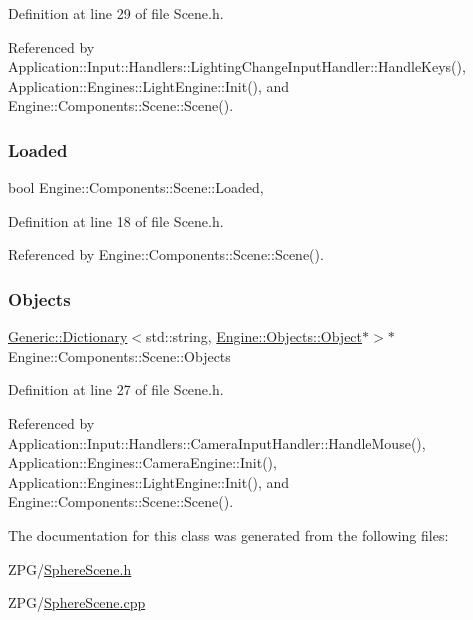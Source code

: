 Definition at line 29 of file Scene.\+h.



Referenced by Application\+::\+Input\+::\+Handlers\+::\+Lighting\+Change\+Input\+Handler\+::\+Handle\+Keys(), Application\+::\+Engines\+::\+Light\+Engine\+::\+Init(), and Engine\+::\+Components\+::\+Scene\+::\+Scene().

\mbox{\label{classEngine_1_1Components_1_1Scene_ae828757eea5410550f6674421051a783}} 
\subsubsection{\texorpdfstring{Loaded}{Loaded}}
{\footnotesize\ttfamily bool Engine\+::\+Components\+::\+Scene\+::\+Loaded\hspace{0.3cm}{\ttfamily [protected]}, {\ttfamily [inherited]}}



Definition at line 18 of file Scene.\+h.



Referenced by Engine\+::\+Components\+::\+Scene\+::\+Scene().

\mbox{\label{classEngine_1_1Components_1_1Scene_a23481feabaaa56bf5613765db03af4da}} 
\subsubsection{\texorpdfstring{Objects}{Objects}}
{\footnotesize\ttfamily \mbox{\hyperlink{classGeneric_1_1Dictionary}{Generic\+::\+Dictionary}}$<$std\+::string, \mbox{\hyperlink{classEngine_1_1Objects_1_1Object}{Engine\+::\+Objects\+::\+Object}}$\ast$$>$$\ast$ Engine\+::\+Components\+::\+Scene\+::\+Objects\hspace{0.3cm}{\ttfamily [inherited]}}



Definition at line 27 of file Scene.\+h.



Referenced by Application\+::\+Input\+::\+Handlers\+::\+Camera\+Input\+Handler\+::\+Handle\+Mouse(), Application\+::\+Engines\+::\+Camera\+Engine\+::\+Init(), Application\+::\+Engines\+::\+Light\+Engine\+::\+Init(), and Engine\+::\+Components\+::\+Scene\+::\+Scene().



The documentation for this class was generated from the following files\+:\begin{DoxyCompactItemize}
\item 
Z\+P\+G/\mbox{\hyperlink{SphereScene_8h}{Sphere\+Scene.\+h}}\item 
Z\+P\+G/\mbox{\hyperlink{SphereScene_8cpp}{Sphere\+Scene.\+cpp}}\end{DoxyCompactItemize}
